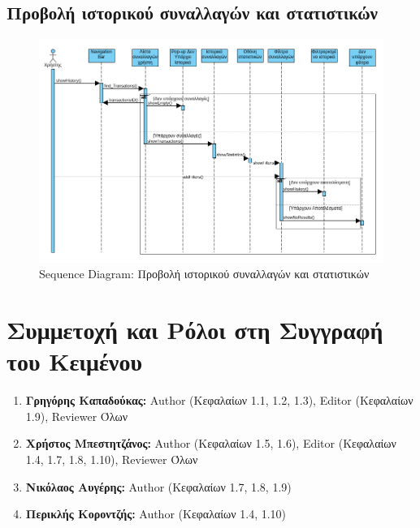 \documentclass[12pt,a4paper]{article}
\begin{document}
\subsection{Προβολή ιστορικού συναλλαγών και στατιστικών}
\begin{figure}[H]
	\includegraphics[width=\textwidth]{History and Statistics Sequence.png}
	\caption{Sequence Diagram: Προβολή ιστορικού συναλλαγών και στατιστικών}
	\label{Sequence Diagram: Προβολή ιστορικού συναλλαγών και στατιστικών}
\end{figure}

\section{Συμμετοχή και Ρόλοι στη Συγγραφή του Κειμένου}
\begin{enumerate}
	\item \textbf{Γρηγόρης Καπαδούκας:} Author (Κεφαλαίων 1.1, 1.2, 1.3), Editor (Κεφαλαίων 1.9), Reviewer Όλων
	\item \textbf{Χρήστος Μπεστητζάνος:} Author (Κεφαλαίων 1.5, 1.6), Editor (Κεφαλαίων 1.4, 1.7, 1.8, 1.10), Reviewer Όλων
   	\item \textbf{Νικόλαος Αυγέρης:} Author (Κεφαλαίων 1.7, 1.8, 1.9)
	\item \textbf{Περικλής Κοροντζής:} Author (Κεφαλαίων 1.4, 1.10)
\end{enumerate}
\end{document}
